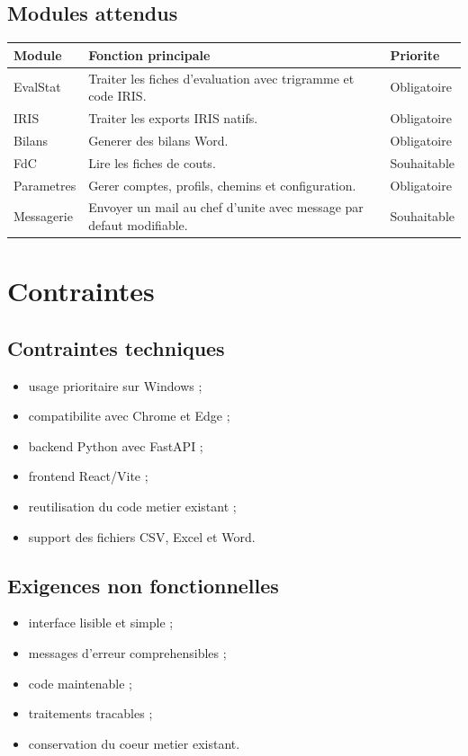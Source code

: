 \documentclass[11pt,a4paper]{report}
\begin{document}
\section{Modules attendus}
\begin{longtable}{L{0.22\textwidth} L{0.54\textwidth} C{0.14\textwidth}}
\toprule
{}
\textbf{Module} & \textbf{Fonction principale} & \textbf{Priorite} \\
\midrule
EvalStat & Traiter les fiches d'evaluation avec trigramme et code IRIS. & Obligatoire \\
IRIS & Traiter les exports IRIS natifs. & Obligatoire \\
Bilans & Generer des bilans Word. & Obligatoire \\
FdC & Lire les fiches de couts. & Souhaitable \\
Parametres & Gerer comptes, profils, chemins et configuration. & Obligatoire \\
Messagerie & Envoyer un mail au chef d'unite avec message par defaut modifiable. & Souhaitable \\
\bottomrule
\end{longtable}

\chapter{Contraintes}

\section{Contraintes techniques}
\begin{itemize}
  \item usage prioritaire sur Windows ;
  \item compatibilite avec Chrome et Edge ;
  \item backend Python avec FastAPI ;
  \item frontend React/Vite ;
  \item reutilisation du code metier existant ;
  \item support des fichiers CSV, Excel et Word.
\end{itemize}

\section{Exigences non fonctionnelles}
\begin{itemize}
  \item interface lisible et simple ;
  \item messages d'erreur comprehensibles ;
  \item code maintenable ;
  \item traitements tracables ;
  \item conservation du coeur metier existant.
\end{itemize}
\end{document}
